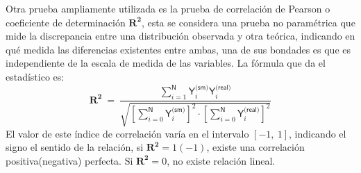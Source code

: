Otra prueba ampliamente utilizada es la prueba de correlación de Pearson o coeficiente de determinación $\mathbf{R^2}$, esta se considera una prueba no paramétrica que mide la discrepancia entre una distribución observada y otra teórica, indicando en qué medida las diferencias existentes entre ambas, una de sus bondades es que es independiente de la escala de medida de las variables. La fórmula que da el estadístico es:
\begin{equation}
\mathbf{R^2} ~ = ~ \dfrac{\sum\limits_{i=1}^\textsf{N} \textsf{Y}_{i}^\textsf{(sm)} \textsf{Y}_{i}^\textsf{(real)}}{\sqrt{\left[\sum\limits_{i=0}^\textsf{N} \textsf{Y}_{i}^\textsf{(sm)}\right]^2 \cdot \left[\sum\limits_{i=0}^\textsf{N} \textsf{Y}_{i}^\textsf{(real)}\right]^2}}
\end{equation}  
El valor de este índice de correlación varía en el intervalo $[-1,~1]$, indicando el signo el sentido de la relación, si $\mathbf{R^2} = 1(-1)$, existe una correlación positiva(negativa) perfecta. Si $\mathbf{R^2} = 0$, no existe relación lineal.












